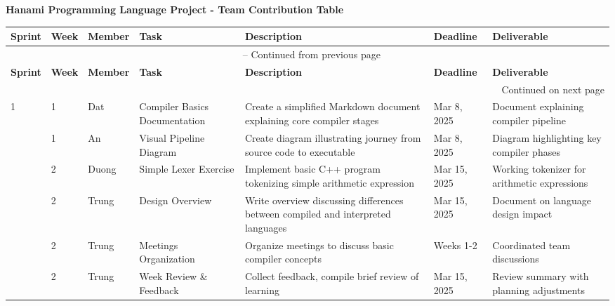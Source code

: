\documentclass[11pt]{article}
\begin{document}
\begin{center}
\Large{\textbf{Hanami Programming Language Project - Team Contribution Table}}
\end{center}

\begin{longtable}{|p{}|p{}|p{}|p{}|p{}|p{}|p{}|}

\hline
\rowcolor{gray!20} %
\textbf{Sprint} & \textbf{Week} & \textbf{Member} & \textbf{Task} & \textbf{Description} & \textbf{Deadline} & \textbf{Deliverable} \\
\hline

\endfirsthead

\multicolumn{7}{c}{\tablename\ \thetable{} -- Continued from previous page} \\
\hline
\rowcolor{gray!20}
\textbf{Sprint} & \textbf{Week} & \textbf{Member} & \textbf{Task} & \textbf{Description} & \textbf{Deadline} & \textbf{Deliverable} \\
\hline
\endhead

\hline \multicolumn{7}{r}{Continued on next page} \\
\endfoot

\hline
\endlastfoot

\arrayrulecolor{black}
\rowcolor{week1color} 
1 & 1 & Dat & Compiler Basics Documentation & Create a simplified Markdown document explaining core compiler stages & Mar 8, 2025 & Document explaining compiler pipeline \\
\rowcolor{week1color} 
& 1& An & Visual Pipeline Diagram & Create diagram illustrating journey from source code to executable & Mar 8, 2025 & Diagram highlighting key compiler phases \\
\rowcolor{week1color} 
& 2 & Duong & Simple Lexer Exercise & Implement basic C++ program tokenizing simple arithmetic expression & Mar 15, 2025 & Working tokenizer for arithmetic expressions \\
\rowcolor{week1color} 
& 2& Trung & Design Overview & Write overview discussing differences between compiled and interpreted languages & Mar 15, 2025 & Document on language design impact \\
\rowcolor{week1color} 
& 2& Trung & Meetings Organization & Organize meetings to discuss basic compiler concepts & Weeks 1-2 & Coordinated team discussions \\
\rowcolor{week1color} 
& 2& Trung & Week Review \& Feedback & Collect feedback, compile brief review of learning & Mar 15, 2025 & Review summary with planning adjustments \\
\hline


\end{longtable}
\end{document}
